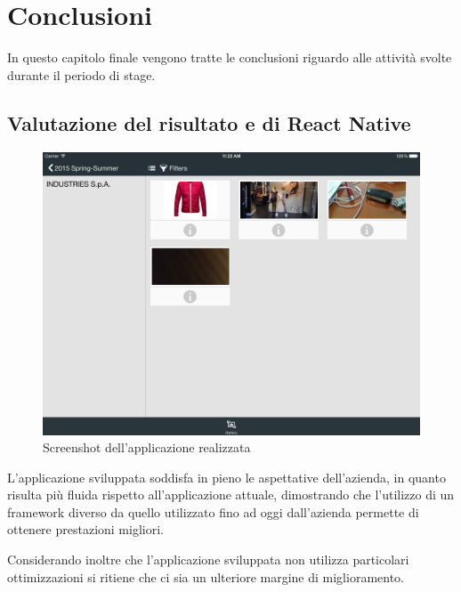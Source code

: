 
\chapter{Conclusioni}
\label{cap:conclusioni}

In questo capitolo finale vengono tratte le conclusioni riguardo alle attività svolte durante il periodo di stage.

\section{Valutazione del risultato e di React Native}

\begin{figure}[htp]
\centering
\includegraphics[width=\textwidth]{../immagini/wg-gallery}
\caption{Screenshot dell'applicazione realizzata}  
\end{figure}

L'applicazione sviluppata soddisfa in pieno le aspettative dell'azienda, in quanto risulta più fluida rispetto all'applicazione attuale, dimostrando che l'utilizzo di un framework diverso da quello utilizzato fino ad oggi dall'azienda permette di ottenere prestazioni migliori.

Considerando inoltre che l'applicazione sviluppata non utilizza particolari ottimizzazioni si ritiene che ci sia un ulteriore margine di miglioramento.

